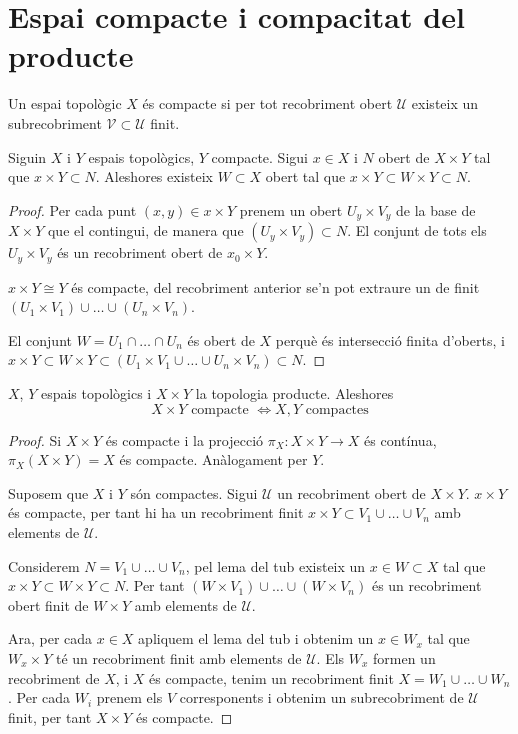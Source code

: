 \section{Espai compacte i compacitat del producte}

\begin{defi}
    Un espai topològic $X$ és compacte si per tot recobriment obert $\mathscr{U}$ existeix un subrecobriment $\mathscr{V}\subset\mathscr{U}$ finit.
\end{defi}

\begin{lema}
    Siguin $X$ i $Y$ espais topològics, $Y$ compacte. Sigui $x\in X$ i $N$ obert de $X \times Y$ tal que $x\times Y \subset N$.
    Aleshores existeix $W \subset X$ obert tal que $x\times Y \subset W \times Y \subset N$.
\end{lema}
\begin{proof}
    Per cada punt $(x,y) \in x\times Y$ prenem un obert $U_y\times V_y$ de la base de $X\times Y$ que el contingui, de manera que $(U_y\times V_y) \subset N$. El conjunt de tots els $U_y\times V_y$ és un recobriment obert de $x_0\times Y$.
    
    $x \times Y \cong Y$ és compacte, del recobriment anterior se'n pot extraure un de finit $(U_1 \times V_1) \cup\dots\cup (U_n \times V_n)$.
    
    El conjunt $W = U_1 \cap\dots\cap U_n$ és obert de $X$ perquè és intersecció finita d'oberts, i $x \times Y \subset W\times Y \subset (U_1 \times V_1 \cup\dots\cup U_n \times V_n) \subset N$.
\end{proof}

\begin{prop}
    $X$, $Y$ espais topològics i $X \times Y$ la topologia producte. Aleshores
    \[X \times Y \text{ compacte } \Longleftrightarrow X,Y \text{ compactes}\]
\end{prop}
\begin{proof}
    Si $X \times Y$ és compacte i la projecció $\pi_X\!: X \times Y \rightarrow X$ és contínua, $\pi_X(X\times Y)=X$ és compacte. Anàlogament per $Y$.
    
    \quad
    
    Suposem que $X$ i $Y$ són compactes. Sigui $\mathscr{U}$ un recobriment obert de $X \times Y$. $x \times Y$ és compacte, per tant hi ha un recobriment finit $x \times Y \subset V_1 \cup\dots\cup V_n$ amb elements de $\mathscr{U}$.
    
    Considerem $N = V_1 \cup\dots\cup V_n$, pel lema del tub existeix un $x \in W \subset X$ tal que $x\times Y \subset W \times Y \subset N$. Per tant $(W \times V_1) \cup\dots\cup (W \times V_n)$ és un recobriment obert finit de $W \times Y$ amb elements de $\mathscr{U}$.
    
    Ara, per cada $x\in X$ apliquem el lema del tub i obtenim un $x \in W_x$ tal que $W_x \times Y$ té un recobriment finit amb elements de $\mathscr{U}$. Els $W_x$ formen un recobriment de $X$, i $X$ és compacte, tenim un recobriment finit $X = W_1 \cup\dots\cup W_n$. Per cada $W_i$ prenem els $V$ corresponents i obtenim un subrecobriment de $\mathscr{U}$ finit, per tant $X\times Y$ és compacte.
    
\end{proof}

